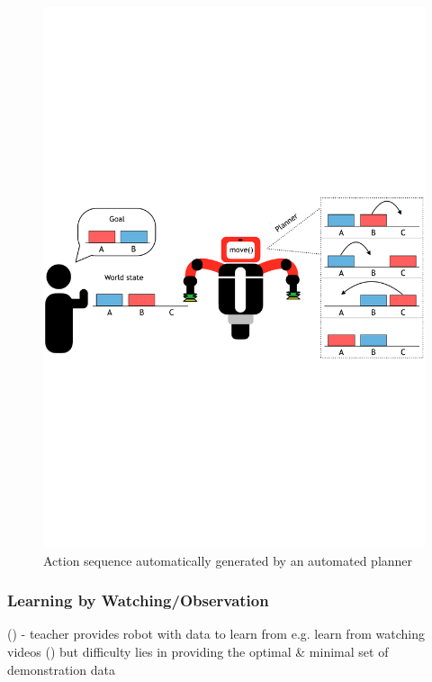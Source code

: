 \begin{figure}[h]
	\centering
	\includegraphics[scale=0.6]{figures/PbD-AutomatedPlanner}
	\caption{Action sequence automatically generated by an automated planner}
	\label{fig:Automated Planner}
\end{figure}

\subsubsection{Learning by Watching/Observation}\label{sssec:LbObservation}
(\cite{kuniyoshi1994learning})
- teacher provides robot with data to learn from e.g. learn from watching videos (\cite{Yang2015})
but difficulty lies in providing the optimal \& minimal set of demonstration data
 